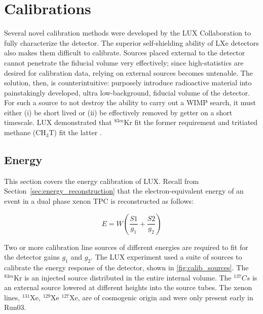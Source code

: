 \section{Calibrations}
Several novel calibration methods were developed by the \ac{LUX} Collaboration to fully characterize the detector. The superior self-shielding ability of \ac{LXe} detectors also makes them difficult to calibrate. Sources placed external to the detector cannot penetrate the fiducial volume very effectively; since high-statistics are desired for calibration data, relying on external sources becomes untenable. The solution, then, is counterintuitive: purposely introduce radioactive material into painstakingly developed, ultra low-background, fiducial volume of the detector. For such a source to not destroy the ability to carry out a \ac{WIMP} search, it must either (i) be short lived or (ii) be effectively removed by getter on a short timescale. \ac{LUX} demonstrated that $^{83m}$Kr fit the former \cite{LUXKr} requirement and tritiated methane (CH$_{3}$T) fit the latter \cite{LUXTritium}.

\subsection{Energy}
This section covers the energy calibration of \ac{LUX}. Recall from Section~\ref{sec:energy_reconstruction} that the electron-equivalent energy of an event in a dual phase xenon \ac{TPC} is reconstructed as follows:

\begin{equation}
E = W (\frac{S1}{g_{1}} + \frac{S2}{g_{2}})
\end{equation}

Two or more calibration line sources of different energies are required to fit for the detector gains $g_{1}$ and $g_{2}$. The \ac{LUX} experiment used a suite of sources to calibrate the energy response of the detector, shown in \ref{fig:calib_sources}. The $^{83m}$Kr is an injected source distributed in the entire internal volume. The $^{137}Cs$ is an external source lowered at different heights into the source tubes. The xenon lines, $^{131}$Xe, $^{129}$Xe $^{127}$Xe, are of cosmogenic origin and were only present early in Run03.

